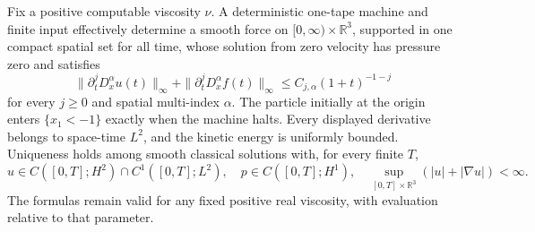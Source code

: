 \begin{theorem}\label{bcs:scalar-theorem}
Fix a positive computable viscosity $\nu$. A deterministic one-tape machine and finite input effectively determine a smooth force on $[0,\infty)\times\mathbb R^3$, supported in one compact spatial set for all time, whose solution from zero velocity has pressure zero and satisfies
\[
 \|\partial_t^jD_x^\alpha u(t)\|_\infty+
 \|\partial_t^jD_x^\alpha f(t)\|_\infty
 \le C_{j,\alpha}(1+t)^{-1-j}
\]
for every $j\ge0$ and spatial multi-index $\alpha$. The particle initially at the origin enters $\{x_1<-1\}$ exactly when the machine halts. Every displayed derivative belongs to space-time $L^2$, and the kinetic energy is uniformly bounded. Uniqueness holds among smooth classical solutions with, for every finite $T$,
\[
 u\in C([0,T];H^2)\cap C^1([0,T];L^2),\quad
 p\in C([0,T];H^1),\quad
 \sup_{[0,T]\times\mathbb R^3}(|u|+|\nabla u|)<\infty.
\]
The formulas remain valid for any fixed positive real viscosity, with evaluation relative to that parameter.
\end{theorem}
